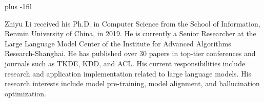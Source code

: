 \documentclass[lettersize,journal]{IEEEtran}
\begin{document}
\baselineskip plus -1fil

\begin{IEEEbiography}{Zhiyu Li} received his Ph.D. in Computer Science from the School of Information, Renmin University of China, in 2019. He is currently a Senior Researcher at the Large Language Model Center of the Institute for Advanced Algorithms Research-Shanghai. He has published over 30 papers in top-tier conferences and journals such as TKDE, KDD, and ACL. His current responsibilities include research and application implementation related to large language models. His research interests include model pre-training, model alignment, and hallucination optimization.
\end{IEEEbiography}

\vfill %
\end{document}
